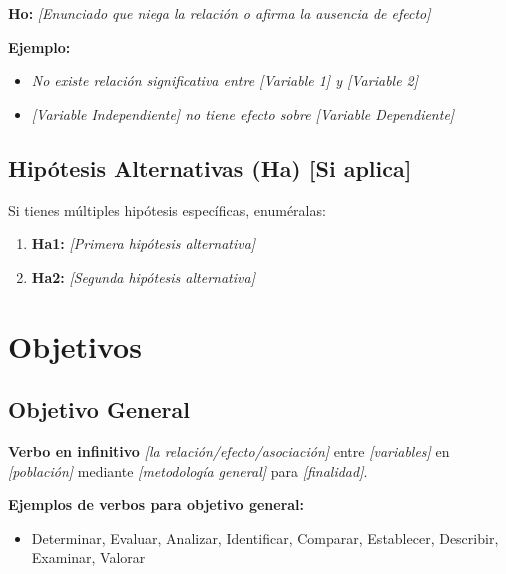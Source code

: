 \textbf{Ho:} \textit{[Enunciado que niega la relación o afirma la ausencia de efecto]}

\textbf{Ejemplo:}
\begin{itemize}
    \item \textit{No existe relación significativa entre [Variable 1] y [Variable 2]}
    \item \textit{[Variable Independiente] no tiene efecto sobre [Variable Dependiente]}
\end{itemize}

\subsection{Hipótesis Alternativas (Ha) [Si aplica]}
\label{subsec:hipotesis_alternativas}

Si tienes múltiples hipótesis específicas, enuméralas:

\begin{enumerate}
    \item \textbf{Ha1:} \textit{[Primera hipótesis alternativa]}
    \item \textbf{Ha2:} \textit{[Segunda hipótesis alternativa]}
\end{enumerate}

\section{Objetivos}
\label{sec:objetivos}


\subsection{Objetivo General}
\label{subsec:objetivo_general}

\textbf{Verbo en infinitivo} \textit{[la relación/efecto/asociación]} entre \textit{[variables]} en \textit{[población]} mediante \textit{[metodología general]} para \textit{[finalidad]}.

\textbf{Ejemplos de verbos para objetivo general:}
\begin{itemize}
    \item Determinar, Evaluar, Analizar, Identificar, Comparar, Establecer, Describir, Examinar, Valorar
\end{itemize}

